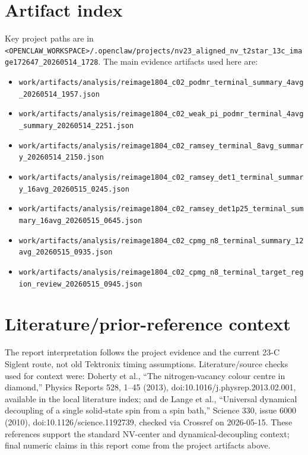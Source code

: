 \documentclass[11pt]{article}
\begin{document}
\section{Artifact index}
Key project paths are in \texttt{<OPENCLAW_WORKSPACE>/.openclaw/projects/nv23\_aligned\_nv\_t2star\_13c\_image172647\_20260514\_1728}. The main evidence artifacts used here are:
\begin{itemize}
  \item \texttt{work/artifacts/analysis/reimage1804\_c02\_podmr\_terminal\_summary\_4avg\_20260514\_1957.json}
  \item \texttt{work/artifacts/analysis/reimage1804\_c02\_weak\_pi\_podmr\_terminal\_4avg\_summary\_20260514\_2251.json}
  \item \texttt{work/artifacts/analysis/reimage1804\_c02\_ramsey\_terminal\_8avg\_summary\_20260514\_2150.json}
  \item \texttt{work/artifacts/analysis/reimage1804\_c02\_ramsey\_det1\_terminal\_summary\_16avg\_20260515\_0245.json}
  \item \texttt{work/artifacts/analysis/reimage1804\_c02\_ramsey\_det1p25\_terminal\_summary\_16avg\_20260515\_0645.json}
  \item \texttt{work/artifacts/analysis/reimage1804\_c02\_cpmg\_n8\_terminal\_summary\_12avg\_20260515\_0935.json}
  \item \texttt{work/artifacts/analysis/reimage1804\_c02\_cpmg\_n8\_terminal\_target\_region\_review\_20260515\_0945.json}
\end{itemize}

\section{Literature/prior-reference context}
The report interpretation follows the project evidence and the current 23-C Siglent route, not old Tektronix timing assumptions. Literature/source checks used for context were: Doherty et al., ``The nitrogen-vacancy colour centre in diamond,'' Physics Reports 528, 1--45 (2013), doi:10.1016/j.physrep.2013.02.001, available in the local literature index; and de Lange et al., ``Universal dynamical decoupling of a single solid-state spin from a spin bath,'' Science 330, issue 6000 (2010), doi:10.1126/science.1192739, checked via Crossref on 2026-05-15. These references support the standard NV-center and dynamical-decoupling context; final numeric claims in this report come from the project artifacts above.
\end{document}
